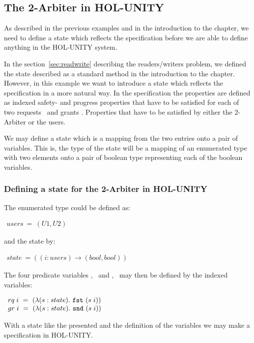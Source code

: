 \subsection{The 2-Arbiter in HOL-UNITY}

As described in the previous examples and in the introduction to the chapter,
we need to define a state which reflects the specification before we are able
to define anything in the HOL-UNITY system.

In the section~\ref{sec:readwrite} describing the readers/writers problem, we
defined the state described as a standard method in the introduction to the
chapter.  However, in this example we want to introduce a state which reflects
the specification in a more natural way.  In the specification the properties
are defined as indexed safety- and progress properties that have to be
satisfied for each of two requests \rqi\ and grants \gri.  Properties that have
to be satisfied by either the 2-Arbiter or the users.

We may define a state which is a mapping from the two entries onto a pair of
variables. This is, the type of the state will be a mapping of an enumerated
type with two elements onto a pair of boolean type representing each of the
boolean variables.

\subsubsection{Defining a state for the 2-Arbiter in HOL-UNITY}

The enumerated type could be defined as:

\cnn $ \begin{array}{l}
	users\ =\ (U1, U2)
\end{array} $

and the state by:

\cnn $ \begin{array}{l}
	state\ = ((i:users)\!\rightarrow\!(bool, bool))
\end{array} $

The four predicate variables \rqa, \gra\ and \rqb, \grb\ may then be defined by
the indexed variables:

\cnn $ \begin{array}{l}
	rq\;i\ =\ (\lambda (s:state).\ {\tt fst}\ (s\;i))\\
	gr\;i\ =\ (\lambda (s:state).\ {\tt snd}\ (s\;i))
\end{array} $

With a state like the presented and the definition of the variables we may
make a specification in HOL-UNITY.


